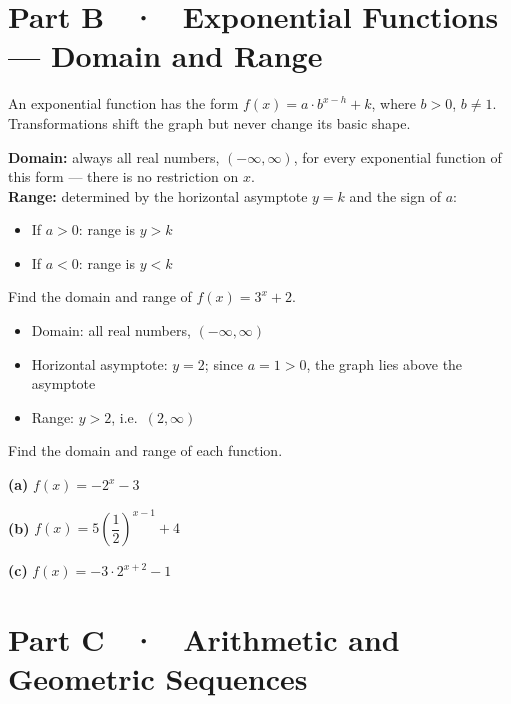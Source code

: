 \documentclass[11pt]{article}
\begin{document}
\section*{Part B \ · \ Exponential Functions --- Domain and Range}

An exponential function has the form $f(x) = a\cdot b^{x-h} + k$, where $b>0$, $b\neq 1$. Transformations shift the graph but never change its basic shape.

\begin{notebox}
\textbf{Domain:} always all real numbers, $(-\infty,\infty)$, for every exponential function of this form --- there is no restriction on $x$.\\[1mm]
\textbf{Range:} determined by the horizontal asymptote $y=k$ and the sign of $a$:
\begin{itemize}[itemsep=1pt,topsep=2pt,leftmargin=5mm]
  \item If $a>0$: range is $y>k$
  \item If $a<0$: range is $y<k$
\end{itemize}
\end{notebox}

\begin{examplebox}
Find the domain and range of $f(x) = 3^x + 2$.
\begin{itemize}[itemsep=1pt,topsep=2pt,leftmargin=5mm]
  \item Domain: all real numbers, $(-\infty,\infty)$
  \item Horizontal asymptote: $y=2$; since $a=1>0$, the graph lies above the asymptote
  \item Range: $y>2$, i.e.\ $(2,\infty)$
\end{itemize}
\end{examplebox}

\begin{hardbox}
Find the domain and range of each function.

\textbf{(a)} $f(x) = -2^x - 3$

\vspace{4mm}
\textbf{(b)} $f(x) = 5\left(\dfrac{1}{2}\right)^{x-1} + 4$

\vspace{4mm}
\textbf{(c)} $f(x) = -3\cdot 2^{x+2} - 1$

\vspace{4mm}
\end{hardbox}

\newpage
\section*{Part C \ · \ Arithmetic and Geometric Sequences}
\end{document}
